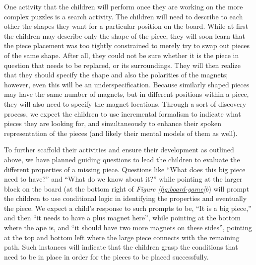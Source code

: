 \documentclass{acm_proc_article-sp}
\begin{document}
One activity that the children will perform once they are working on the more complex puzzles is a search activity. The children will need to describe to each other the shapes they want for a particular position on the board.
While at first the children may describe only the shape of the piece, they will soon learn that the piece placement was too tightly constrained to merely try to swap out pieces of the same shape. 
After all, they could not be sure whether it is the piece in question that needs to be replaced, or its surroundings. 
They will then realize that they should specify the shape and also the polarities of the magnets; however, even this will be an underspecification. 
Because similarly shaped pieces may have the same number of magnets, but in different positions within a piece, they will also need to specify the magnet locations. 
Through a sort of discovery process, we expect the children to use incremental formalism\cite{shipman1999formality} to indicate what pieces they are looking for, and simultaneously to enhance their spoken representation of the pieces (and likely their mental models of them as well).

To further scaffold their activities and ensure their development as outlined above, we have planned guiding questions to lead the children to evaluate the different properties of a missing piece.
Questions like ``What does this big piece need to have?'' and ``What do we know about it?'' while pointing at the larger block on the board (at the bottom right of {\em Figure \ref{fig:board-game}b}) will prompt the children to use conditional logic in identifying the properties and eventually the piece. 
We expect a child's response to such prompts to be, ``It is a big piece,'' and then ``it needs to have a plus magnet here'', while pointing at the bottom where the ape is, and ``it should have two more magnets on these sides'', pointing at the top and bottom left where the large piece connects with the remaining path. 
Such instances will indicate that the children grasp the conditions that need to be in place in order for the pieces to be placed successfully.
\end{document}
